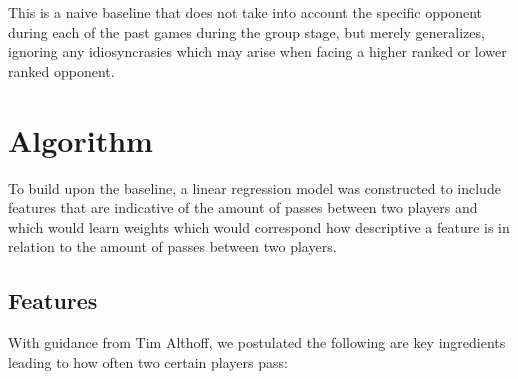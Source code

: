 \documentclass[11pt,letterpaper]{article}
\begin{document}
This is a naive baseline that does not take into account the specific opponent during each of the past games during the group stage, but merely generalizes, ignoring any idiosyncrasies which may arise when facing a higher ranked or lower ranked opponent. 

\section{Algorithm}

To build upon the baseline, a linear regression model was constructed to include features that are indicative of the amount of passes between two players and which would learn weights which would correspond how descriptive a feature is in relation to the amount of passes between two players.

\subsection{Features}
With guidance from Tim Althoff, we postulated the following are key ingredients leading to how often two certain players pass:
\end{document}
